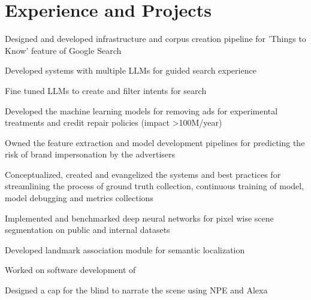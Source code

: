 \documentclass[]{resume-openfont}
\begin{document}
\begin{minipage}[t]{0.63\textwidth} 


\section{Experience and Projects}

\vspace{\topsep} %
\begin{tightemize}
\item Designed and developed infrastructure and corpus creation pipeline for 'Things to Know' feature of Google Search
\item Developed systems with multiple LLMs for guided search experience
\item Fine tuned LLMs to create and filter intents for search
\item Developed the machine learning models for removing ads for experimental treatments and credit repair policies (impact >100M/year)
\item Owned the feature extraction and model development pipelines for predicting the risk of brand impersonation by the advertisers
\item Conceptualized, created and evangelized the systems and best practices for streamlining the process of ground truth collection, continuous training of model, model debugging and metrics collections
\end{tightemize}
\sectionsep

\begin{tightemize}
\item Implemented and benchmarked deep neural networks for pixel wise scene segmentation on public and internal datasets
\item Developed landmark association module for semantic localization
\end{tightemize}
\sectionsep

\begin{tightemize}
\item  Worked on software development of  \href{https://developer.qualcomm.com/software/snapdragon-neural-processing-engine}{}
\item Designed a cap for the blind to narrate the scene using NPE and Alexa


\end{tightemize}
\end{minipage}
\end{document}
